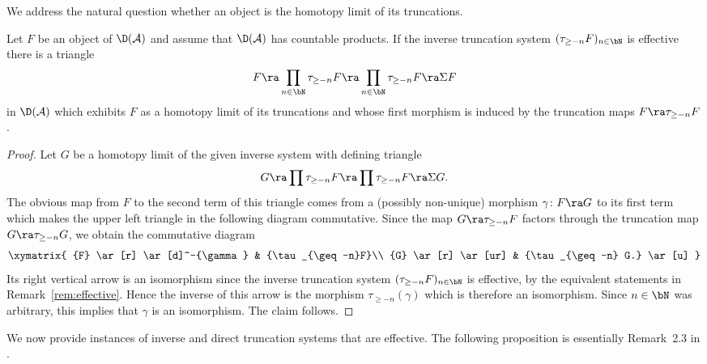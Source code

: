 We address the natural question whether an object is the
homotopy limit of its truncations.  

\begin{lemma}
  \label{l:holim-truncations}
  Let $F$ be an object of $\D(\mathcal{A})$ and assume that
  $\D(\mathcal{A})$ has countable products. 
  If the inverse truncation system $(\tau_{\geq -n}F)_{n \in \bN}$ is
  effective there is a triangle  
  \begin{equation*}
    F \ra \prod_{n \in \bN} \tau_{\geq -n} F \ra \prod_{n \in
      \bN} \tau_{\geq -n} F \ra \Sigma F
  \end{equation*}
  in $\D(\mathcal{A})$ which exhibits $F$ as a
  homotopy limit of its truncations and whose first morphism
  is induced by the truncation maps $F \ra \tau_{\geq -n}F$.
\end{lemma}

\begin{proof}
  Let $G$ be a homotopy limit 
  of the given inverse system
  with defining triangle
  \begin{equation*}
    G \ra \prod \tau_{\geq -n}F \ra \prod \tau_{\geq -n}F \ra
    \Sigma G.
  \end{equation*}
  The obvious map from $F$ to the second term of this triangle
  comes from a 
  (possibly non-unique) morphism $\gamma \colon F \ra G$ to its
  first term which makes the upper left triangle in the
  following diagram commutative.
  Since the map $G \ra \tau_{\geq -n}F$ factors through the
  truncation map $G \ra \tau_{\geq -n}G$, we obtain the
  commutative diagram
  \begin{equation*}
    \xymatrix{
      {F} \ar[r] \ar[d]^-{\gamma} & {\tau_{\geq -n}F}\\
      {G} \ar[r] \ar[ur] & {\tau_{\geq -n} G.} \ar[u]
    }
  \end{equation*}
  Its right vertical arrow is an isomorphism
  since the inverse truncation system $(\tau_{\geq -n}F)_{n \in
    \bN}$ is effective, by the equivalent statements in 
  Remark~\ref{rem:effective}.
  Hence the inverse of this arrow is the morphism 
  $\tau_{\geq -n}(\gamma)$ which is therefore an
  isomorphism. Since $n \in \bN$ was arbitrary, this implies that
  $\gamma$ is an isomorphism. The claim follows.
\end{proof}

We now provide instances of inverse and direct truncation
systems that are effective. 
The following proposition is essentially Remark~2.3 in
\cite{neeman-homotopy-limits}.

